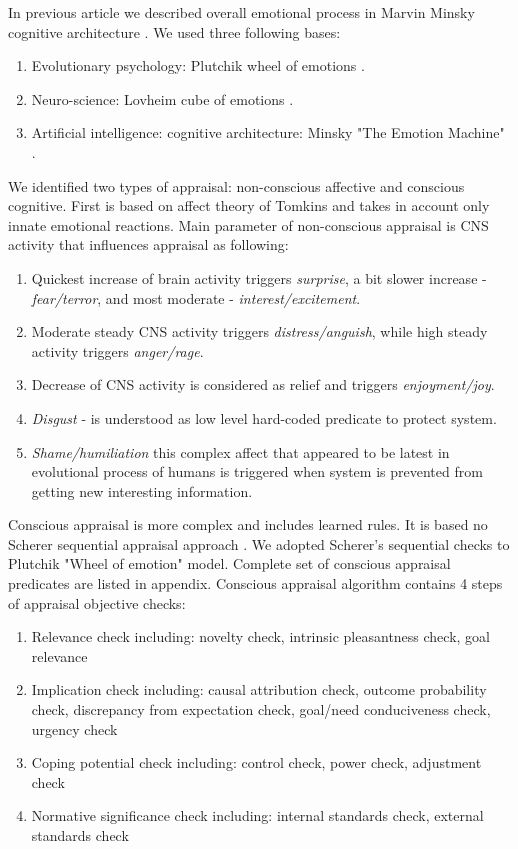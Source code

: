 In previous article \cite{computational_emotional_thinking} we described overall emotional process in Marvin Minsky cognitive architecture \cite{emotionmachine}. We used three following bases:

\begin{enumerate}
	\item Evolutionary psychology: Plutchik wheel of emotions \cite{natureofemotions}.
	\item Neuro-science: Lovheim cube of emotions \cite{cubeofemotions}.
	\item Artificial intelligence: cognitive architecture: Minsky "The Emotion Machine" \cite{emotionmachine}.
\end{enumerate}


We identified two types of appraisal: non-conscious affective and conscious cognitive. First is based on affect theory of Tomkins \cite{primer_affect_psychology} and takes in account only innate emotional reactions. Main parameter of non-conscious appraisal is CNS activity that influences appraisal as following:

\begin{enumerate}
	\item Quickest increase of brain activity triggers \emph{surprise}, a bit slower increase - \emph{fear/terror}, and most moderate - \emph{interest/excitement}.
	\item Moderate steady CNS activity triggers \emph{distress/anguish}, while high steady activity triggers \emph{anger/rage}.
	\item Decrease of CNS activity is considered as relief and triggers \emph{enjoyment/joy}.
	\item \emph{Disgust} - is understood as low level hard-coded predicate to protect system.
	\item \emph{Shame/humiliation} this complex affect that appeared to be latest in evolutional process of humans is triggered when system is prevented from getting new interesting information.
\end{enumerate}

Conscious appraisal is more complex and includes learned rules. It is based no Scherer sequential appraisal approach \cite{appraisal_considered_as_a_process}. We adopted Scherer's sequential checks to Plutchik "Wheel of emotion" \cite{natureofemotions} model. Complete set of conscious appraisal predicates are listed in appendix. Conscious appraisal algorithm contains 4 steps of appraisal objective checks:

\begin{enumerate}
	\item  Relevance check including: novelty check, intrinsic pleasantness check, goal relevance
	\item  Implication check including: causal attribution check, outcome probability check, discrepancy from expectation check, goal/need conduciveness check, urgency check
	\item  Coping potential check including: control check, power check, adjustment check
	\item  Normative significance check including: internal standards check, external standards check
\end{enumerate}

